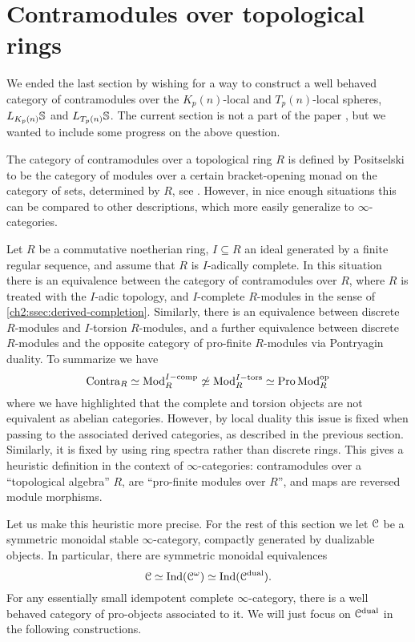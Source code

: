 
\section{Contramodules over topological rings}
\label{ch2:addendum}

We ended the last section by wishing for a way to construct a well behaved category of contramodules over the $K_p(n)$-local and $T_p(n)$-local spheres, $L_\Kpn\S$ and $L_{T_p(n)}\S$. The current section is not a part of the paper \cite{aambo_2024_positselski}, but we wanted to include some progress on the above question. 

The category of contramodules over a topological ring $R$ is defined by Positselski to be the category of modules over a certain bracket-opening monad on the category of sets, determined by $R$, see \cite{positselski_2022_contramodules}. However, in nice enough situations this can be compared to other descriptions, which more easily generalize to $\infty$-categories. 

\begin{remark}
    \label{ch2:rm:contra-as-op-pro-modules}
    Let $R$ be a commutative noetherian ring, $I\subseteq R$ an ideal generated by a finite regular sequence, and assume that $R$ is $I$-adically complete. In this situation there is an equivalence between the category of contramodules over $R$, where $R$ is treated with the $I$-adic topology, and $I$-complete $R$-modules in the sense of \cref{ch2:ssec:derived-completion}. Similarly, there is an equivalence between discrete $R$-modules and $I$-torsion $R$-modules, and a further equivalence between discrete $R$-modules and the opposite category of pro-finite $R$-modules via Pontryagin duality. To summarize we have  
    \[\Contra_R \simeq \Mod_R\Icomp \not\simeq \Mod_R\Itors\simeq \Pro\Mod_R\op\]
    where we have highlighted that the complete and torsion objects are not equivalent as abelian categories. However, by local duality this issue is fixed when passing to the associated derived categories, as described in the previous section. Similarly, it is fixed by using ring spectra rather than discrete rings. This gives a heuristic definition in the context of $\infty$-categories: contramodules over a ``topological algebra'' $R$, are ``pro-finite modules over $R$'', and maps are reversed module morphisms.  
\end{remark}

Let us make this heuristic more precise. For the rest of this section we let $\C$ be a symmetric monoidal stable $\infty$-category, compactly generated by dualizable objects. In particular, there are symmetric monoidal equivalences 
\[\C \simeq \Ind(\C^\omega) \simeq \Ind(\C\dual).\]
For any essentially small idempotent complete $\infty$-category, there is a well behaved category of pro-objects associated to it. We will just focus on $\C\dual$ in the following constructions. 


